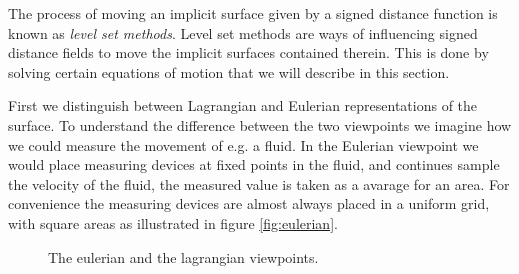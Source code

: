 The process of moving an implicit surface given by a signed distance
function is known as \emph{level set methods}. Level set methods are
ways of influencing signed distance fields to move the implicit
surfaces contained therein. This is done by solving certain equations
of motion that we will describe in this section.

First we distinguish between Lagrangian and Eulerian representations
of the surface.  To understand the difference between the two
viewpoints we imagine how we could measure the movement of e.g. a
fluid. In the Eulerian viewpoint we would place measuring devices at
fixed points in the fluid, and continues sample the velocity of the
fluid, the measured value is taken as a avarage for an area. For
convenience the measuring devices are almost always placed in a
uniform grid, with square areas as illustrated in figure
\ref{fig:eulerian}.

\begin{figure}[h]
  \centering
  \caption{The eulerian and the lagrangian viewpoints.}
  \label{fig:eulerian-lagrangian}
\end{figure}

